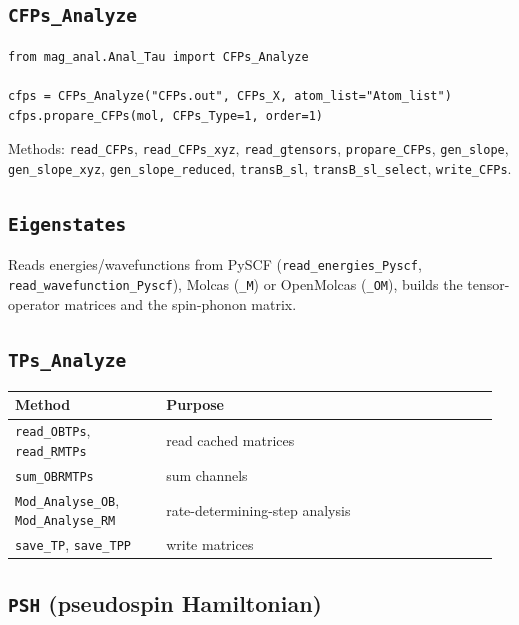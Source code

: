 \documentclass[11pt,a4paper]{article}
\providecommand{\texorpdfstring}[2]{#1}
\begin{document}
\subsection{\texorpdfstring{\texttt{CFPs\_Analyze}}{9.2 CFPs\_Analyze}}\label{cfps_analyze}

\begin{lstlisting}
from mag_anal.Anal_Tau import CFPs_Analyze

cfps = CFPs_Analyze("CFPs.out", CFPs_X, atom_list="Atom_list")
cfps.propare_CFPs(mol, CFPs_Type=1, order=1)
\end{lstlisting}

Methods: \texttt{read\_CFPs}, \texttt{read\_CFPs\_xyz},
\texttt{read\_gtensors}, \texttt{propare\_CFPs}, \texttt{gen\_slope},
\texttt{gen\_slope\_xyz}, \texttt{gen\_slope\_reduced},
\texttt{transB\_sl}, \texttt{transB\_sl\_select}, \texttt{write\_CFPs}.

\subsection{\texorpdfstring{\texttt{Eigenstates}}{9.3 Eigenstates}}\label{eigenstates}

Reads energies/wavefunctions from PySCF (\texttt{read\_energies\_Pyscf},
\texttt{read\_wavefunction\_Pyscf}), Molcas (\texttt{\_M}) or OpenMolcas
(\texttt{\_OM}), builds the tensor-operator matrices and the spin-phonon
matrix.

\subsection{\texorpdfstring{\texttt{TPs\_Analyze}}{9.4 TPs\_Analyze}}\label{tps_analyze}

\begin{longtable}[]{@{}>{\raggedright\arraybackslash}p{0.30\linewidth} >{\raggedright\arraybackslash}p{0.66\linewidth}@{}}
\toprule
Method & Purpose\tabularnewline
\midrule
\endhead
\texttt{read\_OBTPs}, \texttt{read\_RMTPs} & read cached
matrices\tabularnewline
\texttt{sum\_OBRMTPs} & sum channels\tabularnewline
\texttt{Mod\_Analyse\_OB}, \texttt{Mod\_Analyse\_RM} &
rate-determining-step analysis\tabularnewline
\texttt{save\_TP}, \texttt{save\_TPP} & write matrices\tabularnewline
\bottomrule
\end{longtable}

\subsection{\texorpdfstring{\texttt{PSH} (pseudospin
Hamiltonian)}{9.5 PSH (pseudospin Hamiltonian)}}\label{psh-pseudospin-hamiltonian}
\end{document}

